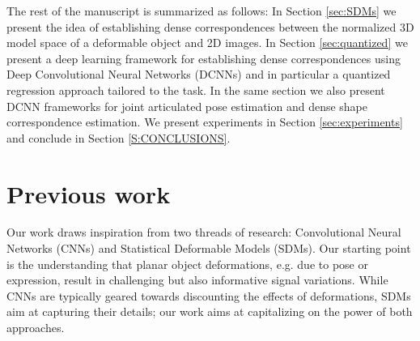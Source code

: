 The rest of the manuscript is summarized as follows: In Section \ref{sec:SDMs} we present the idea of establishing dense correspondences between the normalized 3D model space of a deformable object and 2D images. In Section \ref{sec:quantized} we present a deep learning framework for establishing dense correspondences using Deep Convolutional Neural Networks (DCNNs) and in particular a quantized regression approach tailored to the task. In the same section we also present DCNN frameworks for joint articulated pose estimation and dense shape correspondence estimation. We present experiments in Section \ref{sec:experiments} and conclude in Section \ref{S:CONCLUSIONS}.

 
 
\section{Previous work}

Our work draws inspiration from two threads of research:  Convolutional Neural Networks (CNNs) and Statistical Deformable Models (SDMs).
Our starting point is the understanding that 
planar object deformations, e.g. due to pose or expression, result in challenging but also informative signal variations. While CNNs are typically geared towards discounting
the effects of deformations,  SDMs aim at capturing their details; our work aims
at capitalizing on the power of both approaches.


